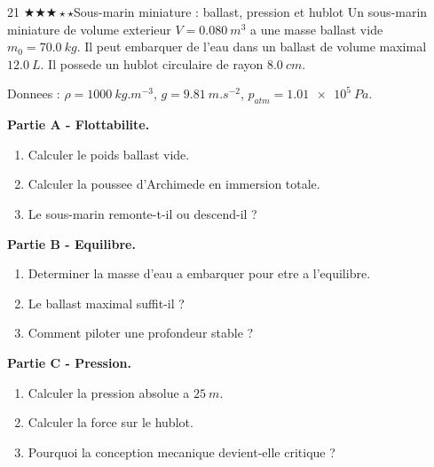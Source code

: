\documentclass[11pt,a4paper]{article}
\newcommand{\diffthree}{\(\bigstar\bigstar\bigstar\star\star\)}
\begin{document}
\begin{probleme}{21 \diffthree}{Sous-marin miniature : ballast, pression et hublot}
Un sous-marin miniature de volume exterieur \(V=\SI{0.080}{m^3}\) a une masse ballast vide \(m_0=\SI{70.0}{kg}\). Il peut embarquer de l'eau dans un ballast de volume maximal \(\SI{12.0}{L}\). Il possede un hublot circulaire de rayon \(\SI{8.0}{cm}\).

Donnees : \(\rho=\SI{1000}{kg.m^{-3}}\), \(g=\SI{9.81}{m.s^{-2}}\), \(p_{atm}=\SI{1.01e5}{Pa}\).

\textbf{Partie A - Flottabilite.}
\begin{enumerate}
\item Calculer le poids ballast vide.
\item Calculer la poussee d'Archimede en immersion totale.
\item Le sous-marin remonte-t-il ou descend-il ?
\end{enumerate}

\textbf{Partie B - Equilibre.}
\begin{enumerate}[resume]
\item Determiner la masse d'eau a embarquer pour etre a l'equilibre.
\item Le ballast maximal suffit-il ?
\item Comment piloter une profondeur stable ?
\end{enumerate}

\textbf{Partie C - Pression.}
\begin{enumerate}[resume]
\item Calculer la pression absolue a \(\SI{25}{m}\).
\item Calculer la force sur le hublot.
\item Pourquoi la conception mecanique devient-elle critique ?
\end{enumerate}
\end{probleme}
\end{document}
